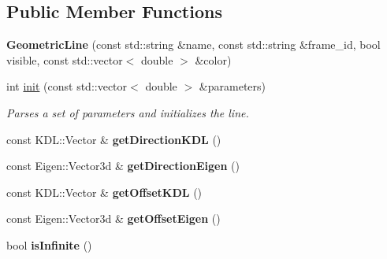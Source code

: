 \subsection*{Public Member Functions}
\begin{DoxyCompactItemize}
\item 
\hypertarget{classhiqp_1_1geometric__primitives_1_1GeometricLine_a1f0ff1cd774363ef7a70095b066a4622}{{\bfseries Geometric\-Line} (const std\-::string \&name, const std\-::string \&frame\-\_\-id, bool visible, const std\-::vector$<$ double $>$ \&color)}\label{classhiqp_1_1geometric__primitives_1_1GeometricLine_a1f0ff1cd774363ef7a70095b066a4622}

\item 
int \hyperlink{classhiqp_1_1geometric__primitives_1_1GeometricLine_af6c0a5187fe9d298eaf2c8ef0637436f}{init} (const std\-::vector$<$ double $>$ \&parameters)
\begin{DoxyCompactList}\small\item\em Parses a set of parameters and initializes the line. \end{DoxyCompactList}\item 
\hypertarget{classhiqp_1_1geometric__primitives_1_1GeometricLine_a90b023a0126706d35719c9b9637915ba}{const K\-D\-L\-::\-Vector \& {\bfseries get\-Direction\-K\-D\-L} ()}\label{classhiqp_1_1geometric__primitives_1_1GeometricLine_a90b023a0126706d35719c9b9637915ba}

\item 
\hypertarget{classhiqp_1_1geometric__primitives_1_1GeometricLine_a66fe98ec0916331d12881f49cc4d9c69}{const Eigen\-::\-Vector3d \& {\bfseries get\-Direction\-Eigen} ()}\label{classhiqp_1_1geometric__primitives_1_1GeometricLine_a66fe98ec0916331d12881f49cc4d9c69}

\item 
\hypertarget{classhiqp_1_1geometric__primitives_1_1GeometricLine_abe8104c0a22ae25c1605fbafce4a28a9}{const K\-D\-L\-::\-Vector \& {\bfseries get\-Offset\-K\-D\-L} ()}\label{classhiqp_1_1geometric__primitives_1_1GeometricLine_abe8104c0a22ae25c1605fbafce4a28a9}

\item 
\hypertarget{classhiqp_1_1geometric__primitives_1_1GeometricLine_af454ca8815f308b7274b335b9f31c243}{const Eigen\-::\-Vector3d \& {\bfseries get\-Offset\-Eigen} ()}\label{classhiqp_1_1geometric__primitives_1_1GeometricLine_af454ca8815f308b7274b335b9f31c243}

\item 
\hypertarget{classhiqp_1_1geometric__primitives_1_1GeometricLine_a21cecdd031b36189ae2903751d2f0381}{bool {\bfseries is\-Infinite} ()}\label{classhiqp_1_1geometric__primitives_1_1GeometricLine_a21cecdd031b36189ae2903751d2f0381}


\end{DoxyCompactItemize}
